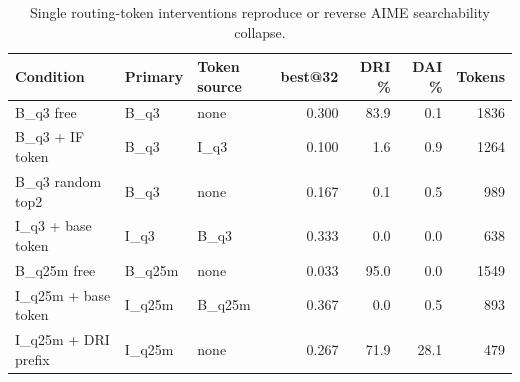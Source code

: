 \begin{table}[t]
\centering
\small
\caption{Single routing-token interventions reproduce or reverse AIME searchability collapse.}
\label{tab:single-token-intervention}
\begin{tabular}{lllrrrr}
\toprule
Condition & Primary & Token source & best@32 & DRI \% & DAI \% & Tokens \\
\midrule
B\_q3 free & B\_q3 & none & 0.300 & 83.9 & 0.1 & 1836 \\
B\_q3 + IF token & B\_q3 & I\_q3 & 0.100 & 1.6 & 0.9 & 1264 \\
B\_q3 random top2 & B\_q3 & none & 0.167 & 0.1 & 0.5 & 989 \\
I\_q3 + base token & I\_q3 & B\_q3 & 0.333 & 0.0 & 0.0 & 638 \\
B\_q25m free & B\_q25m & none & 0.033 & 95.0 & 0.0 & 1549 \\
I\_q25m + base token & I\_q25m & B\_q25m & 0.367 & 0.0 & 0.5 & 893 \\
I\_q25m + DRI prefix & I\_q25m & none & 0.267 & 71.9 & 28.1 & 479 \\
\bottomrule
\end{tabular}
\end{table}
